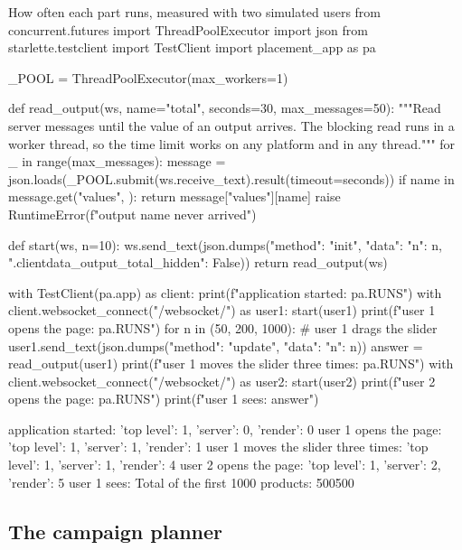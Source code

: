 \begin{pylisting}[label={lst:placement}]{How often each part runs, measured with two simulated users}
from concurrent.futures import ThreadPoolExecutor
import json
from starlette.testclient import TestClient
import placement_app as pa

_POOL = ThreadPoolExecutor(max_workers=1)

def read_output(ws, name="total", seconds=30, max_messages=50):
    """Read server messages until the value of an output arrives. The blocking read runs
    in a worker thread, so the time limit works on any platform and in any thread."""
    for _ in range(max_messages):
        message = json.loads(_POOL.submit(ws.receive_text).result(timeout=seconds))
        if name in message.get("values", {}):
            return message["values"][name]
    raise RuntimeError(f"output {name} never arrived")


def start(ws, n=10):
    ws.send_text(json.dumps({"method": "init", "data": {
        "n": n, ".clientdata_output_total_hidden": False}}))
    return read_output(ws)

with TestClient(pa.app) as client:
    print(f"application started:                  {pa.RUNS}")
    with client.websocket_connect("/websocket/") as user1:
        start(user1)
        print(f"user 1 opens the page:                {pa.RUNS}")
        for n in (50, 200, 1000):                 # user 1 drags the slider
            user1.send_text(json.dumps({"method": "update", "data": {"n": n}}))
            answer = read_output(user1)
        print(f"user 1 moves the slider three times:  {pa.RUNS}")
        with client.websocket_connect("/websocket/") as user2:
            start(user2)
            print(f"user 2 opens the page:                {pa.RUNS}")
print(f"user 1 sees: {answer}")
\end{pylisting}
\begin{pyoutput}
application started:                  {'top level': 1, 'server': 0, 'render': 0}
user 1 opens the page:                {'top level': 1, 'server': 1, 'render': 1}
user 1 moves the slider three times:  {'top level': 1, 'server': 1, 'render': 4}
user 2 opens the page:                {'top level': 1, 'server': 2, 'render': 5}
user 1 sees: Total of the first 1000 products: 500500
\end{pyoutput}

\subsection{The campaign planner}

